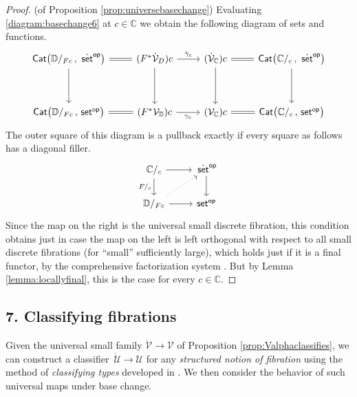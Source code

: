 \documentclass[11pt]{article}
\newcommand{\C}{\ensuremath{\mathbb{C}}}
\newcommand{\D}{\ensuremath{\mathbb{D}}}
\newcommand{\Set}{\ensuremath{\mathsf{Set}}}
\newcommand{\set}{\ensuremath{\mathsf{set}}}
\newcommand{\Cat}{\ensuremath{\mathsf{Cat}}}
\renewcommand{\to}{\ensuremath{\rightarrow}}
\newcommand{\U}{\ensuremath{\mathcal{U}}}
\newcommand{\UU}{\ensuremath{\,\dot{\mathcal{U}}}}
\newcommand{\SSet}{\ensuremath{\,\dot{\Set}}}
\newcommand{\sset}{\ensuremath{\,\dot{\set}}}
\newcommand{\V}{\ensuremath{\mathcal{V}}}
\newcommand{\VV}{\ensuremath{\dot{\mathcal{V}}}}
\theoremstyle{remark}
\theoremstyle{definition}
\begin{document}
\begin{proof}(of Proposition \ref{prop:universebasechange})
Evaluating \eqref{diagram:basechange6} at $c\in \C$ we obtain the following diagram of sets and functions.
%
\begin{equation}\label{diagram:basechange7}
\begin{tikzcd}
\Cat\big( {\D/_{Fc}}\,,\, \sset^{\mathsf{op}} \big) \ar[dd]   \ar[r, equals]  & (F^*\VV_D)c \ar[dd]  \ar[r, "{\dot{\gamma}_c}"] 
	& (\VV_\C)c \ar[dd]  \ar[r, equals] & \Cat\big( {\C/_c}\,,\, \sset^{\mathsf{op}} \big) \ar[dd]    \\
&&&\\
 \Cat\big( {\D/_{Fc}}\,,\, \set^{\mathsf{op}} \big)   \ar[r, equals]  & (F^*\V_\D)c \ar[r,swap, "{\gamma_c}"] 
 	& (\V_\C)c \ar[r, equals] & \Cat\big( {\C/_c}\,,\, \set^{\mathsf{op}} \big)  
\end{tikzcd}
\end{equation}
%
The outer square of this diagram is a pullback exactly if every square as follows has a diagonal filler.
\begin{equation}\label{diagram:basechange8}
\begin{tikzcd}
\C/_c \ar[d,swap, "F/_c"]  \ar[r] & \sset^{\mathsf{op}}  \ar[d]  \\
\D/_{Fc} \ar[r] \ar[ru, dotted] & \set^{\mathsf{op}}
\end{tikzcd}
\end{equation}
Since the map on the right is the universal small discrete fibration, this condition obtains just in case the map on the left is left orthogonal with respect to all small discrete fibrations (for ``small'' sufficiently large), which holds just if it is a final functor, by the comprehensive factorization system \cite{Street-Walters-1973}. But by Lemma \ref{lemma:locallyfinal}, this is the case for every $c\in\C$.
\end{proof}

\subsection*{7. Classifying fibrations}

Given the universal small family $\VV\to \V$ of Proposition \ref{prop:Valphaclassifies}, we can construct a classifier $\UU\to\U$ for any \emph{structured notion of fibration} using the method of \emph{classifying types} developed in \cite{AwodeyCCMC}.  We then consider the behavior of such universal maps under base change.
\end{document}
